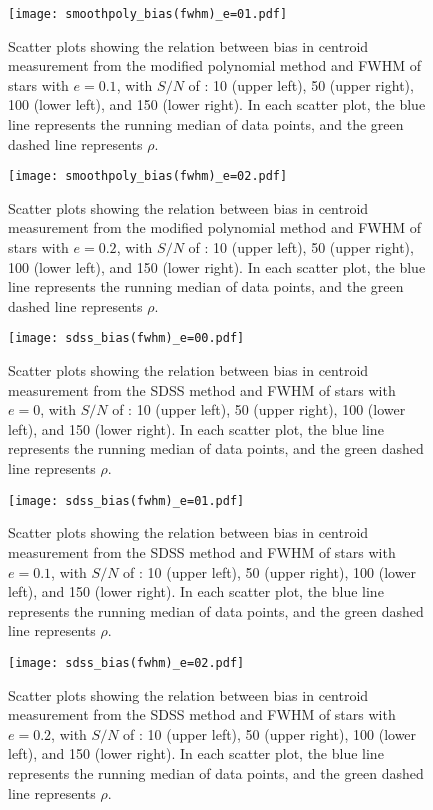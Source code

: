 \documentclass[12pt, preprint]{aastex}
\begin{document}
\begin{figure}[!htb]
  \texttt{[image: smoothpoly\_bias(fwhm)\_e=01.pdf]}
\endminipage
\caption{Scatter plots showing the relation between bias in centroid measurement from the modified polynomial method and FWHM of stars with $e=0.1$, with $S/N$  of : 10 (upper left), 50 (upper right), 100 (lower left), and 150 (lower right). In each scatter plot, the blue line represents the running median of data points, and the green dashed line represents $\rho$.}\label{20}
\end{figure}

\begin{figure}[!htb]
  \texttt{[image: smoothpoly\_bias(fwhm)\_e=02.pdf]}
\endminipage
\caption{Scatter plots showing the relation between bias in centroid measurement from the modified polynomial method and FWHM of stars with $e=0.2$, with $S/N$  of : 10 (upper left), 50 (upper right), 100 (lower left), and 150 (lower right). In each scatter plot, the blue line represents the running median of data points, and the green dashed line represents $\rho$.}\label{21}
\end{figure}


\begin{figure}[!htb]
  \texttt{[image: sdss\_bias(fwhm)\_e=00.pdf]}
\endminipage
\caption{Scatter plots showing the relation between bias in centroid measurement from the SDSS method and FWHM of stars with $e=0$, with $S/N$  of : 10 (upper left), 50 (upper right), 100 (lower left), and 150 (lower right). In each scatter plot, the blue line represents the running median of data points, and the green dashed line represents $\rho$.}\label{22}
\end{figure}

\begin{figure}[!htb]
  \texttt{[image: sdss\_bias(fwhm)\_e=01.pdf]}
\endminipage
\caption{Scatter plots showing the relation between bias in centroid measurement from the SDSS method and FWHM of stars with $e=0.1$, with $S/N$  of : 10 (upper left), 50 (upper right), 100 (lower left), and 150 (lower right). In each scatter plot, the blue line represents the running median of data points, and the green dashed line represents $\rho$.}\label{23}
\end{figure}

\begin{figure}[!htb]
  \texttt{[image: sdss\_bias(fwhm)\_e=02.pdf]}
\endminipage
\caption{Scatter plots showing the relation between bias in centroid measurement from the SDSS method and FWHM of stars with $e=0.2$, with $S/N$  of : 10 (upper left), 50 (upper right), 100 (lower left), and 150 (lower right). In each scatter plot, the blue line represents the running median of data points, and the green dashed line represents $\rho$.}\label{24}
\end{figure}
\end{document}
